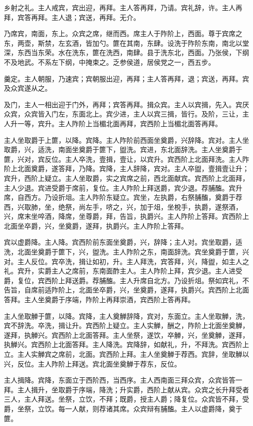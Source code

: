 \documentclass[]{article}
\begin{document}
乡射之礼。主人戒宾，宾出迎，再拜。主人答再拜，乃请。宾礼辞，许。主人再拜，宾答再拜。主人退；宾送，再拜。无介。

乃席宾，南面，东上。众宾之席，继而西。席主人于阼阶上，西面。尊于宾席之东，两壶，斯禁，左玄酒，皆加勺。篚在其南，东肆。设洗于阼阶东南，南北以堂深，东西当东荣。水在洗东，篚在洗西，南肆。县于洗东北，西面。乃张侯，下纲不及地武。不系左下纲，中掩束之。乏参侯道，居侯党之一，西五步。

羹定。主人朝服，乃速宾；宾朝服出迎，再拜；主人答再拜，退；宾送，再拜。宾及众宾遂从之。

及门，主人一相出迎于门外，再拜；宾答再拜。揖众宾。主人以宾揖，先入。宾厌众宾，众宾皆入门左，东面北上。宾少进，主人以宾三揖，皆行。及阶，三让，主人升一等，宾升。主人阼阶上当楣北面再拜，宾西阶上当楣北面答再拜。

主人坐取爵于上篚，以降。宾降。主人阼阶前西面坐奠爵，兴辞降。宾对。主人坐取爵，兴，适洗，南面坐奠爵于篚下，盥洗。宾进，东北面辞洗。主人坐奠爵于篚，兴对，宾反位。主人卒洗，壹揖，壹让，以宾升。宾西阶上北面拜洗。主人阼阶上北面奠爵，遂答拜，乃降。宾降，主人辞降，宾对。主人卒盥，壹揖壹让升；宾升，西阶上疑立。主人坐取爵，实之宾席之前，西北面献宾。宾西阶上北面拜，主人少退。宾进受爵于席前，复位。主人阼阶上拜送爵，宾少退。荐脯醢。宾升席，自西方。乃设折俎。主人阼阶东疑立。宾坐，左执爵，右祭脯醢，奠爵于荐西，兴取肺，坐，绝祭，尚左手，哜之，兴，加于俎，坐梲手，执爵，遂祭酒，兴，席末坐啐酒，降席，坐尊爵，拜，告旨，执爵兴。主人阼阶上答拜。宾西阶上北面坐卒爵，兴，坐奠爵，遂拜，执爵兴。主人阼阶上答拜。

宾以虚爵降。主人降。宾西阶前东面坐奠爵，兴，辞降；主人对。宾坐取爵，适洗，北面坐奠爵于篚下，兴，盥洗。主人阼阶之东，南面辞洗。宾坐奠爵于篚，兴对。主人反位。宾卒洗，揖让如初，升。主人拜洗，宾答拜，兴，降盥，如主人之礼。宾升，实爵主人之席前，东南面酢主人。主人阼阶上拜，宾少退。主人进受爵，复位，宾西阶上拜送爵。荐脯醢。主人升席自北方。乃设折俎。祭如宾礼，不告旨，自席前适阼阶上，北面坐卒爵，兴，坐奠爵，遂拜，执爵兴。宾西阶上北面答拜。主人坐奠爵于序端，阼阶上再拜崇酒，宾西阶上答再拜。

主人坐取觯于篚，以降。宾降，主人奠觯辞降，宾对，东面立。主人坐取觯，洗，宾不辞洗。卒洗，揖让升。宾西阶上疑立。主人实觯，酬之，阼阶上北面坐奠觯，遂拜，执觯兴。宾西阶上北面答拜。主人坐祭，遂饮，卒觯，兴，坐奠觯，遂拜，执觯兴。宾西阶上北面答拜。主人降洗。宾降辞，如献礼，升，不拜洗。宾西阶上立。主人实觯宾之席前，北面。宾西阶上拜。主人坐奠觯于荐西。宾辞，坐取觯以兴，反位。主人阼阶上拜送。宾北面坐奠觯于荐东，反位。

主人揖降。宾降，东面立于西阶西，当西序。主人西南面三拜众宾，众宾皆答一拜。主人揖升，坐取爵于序端，降洗；升实爵，西阶上献从宾。众宾之长升拜受者三人，主人拜送。坐祭，立饮，不拜；既爵，授主人爵；降复位。众宾皆不拜，受爵，坐祭，立饮。每一人献，则荐诸其席。众宾辩有脯醢。主人以虚爵降，奠于篚。
\end{document}
